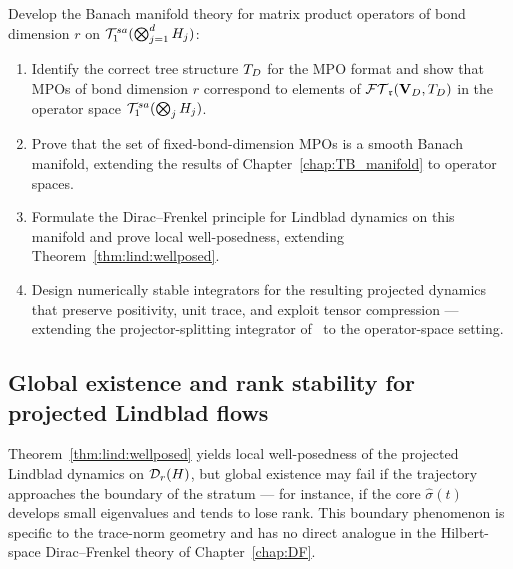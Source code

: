 \begin{problem}
\label{prob:lindblad_tensor}
Develop the Banach manifold theory for matrix product operators of
bond dimension $r$ on $\mathcal{T}_{1}^{sa}(\bigotimes_{j=1}^d H_j)$:
\begin{enumerate}
\item[\textup{(a)}] Identify the correct tree structure $T_D$ for the
    MPO format and show that MPOs of bond dimension $r$ correspond to
    elements of $\mathcal{FT}_{\mathfrak{r}}(\mathbf{V}_D,T_D)$ in the operator space $\mathcal{T}_{1}^{sa}(\bigotimes_j H_j)$.
\item[\textup{(b)}] Prove that the set of fixed-bond-dimension MPOs is
    a smooth Banach manifold, extending the results of
    Chapter~\ref{chap:TB_manifold} to operator spaces.
\item[\textup{(c)}] Formulate the Dirac--Frenkel principle for Lindblad
    dynamics on this manifold and prove local well-posedness, extending
    Theorem~\ref{thm:lind:wellposed}.
\item[\textup{(d)}] Design numerically stable integrators for the
    resulting projected dynamics that preserve positivity, unit trace,
    and exploit tensor compression — extending the projector-splitting
    integrator of~\cite{LubichOseledetsVandereycken2015} to the
    operator-space setting.
\end{enumerate}
\end{problem}

\subsection*{Global existence and rank stability for projected Lindblad flows}

Theorem~\ref{thm:lind:wellposed} yields local well-posedness of the
projected Lindblad dynamics on $\mathcal{D}_{r}(H)$, but global existence
may fail if the trajectory approaches the boundary of the stratum —
for instance, if the core $\hat\sigma(t)$ develops small eigenvalues
and tends to lose rank. This boundary phenomenon is specific to the
trace-norm geometry and has no direct analogue in the Hilbert-space
Dirac--Frenkel theory of Chapter~\ref{chap:DF}.


